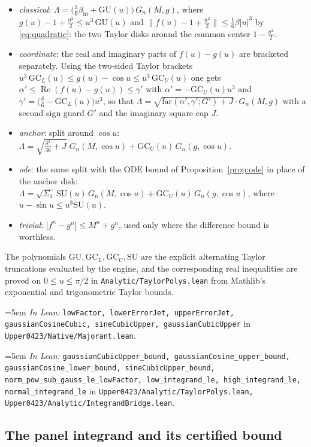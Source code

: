\documentclass[11pt,a4paper]{article}
\theoremstyle{definition}
\newcommand{\Lean}[1]{\texttt{#1}}
\newcommand{\file}[1]{\texttt{#1}}
\newcommand{\formal}[2]{%
  \par\smallskip
  \begingroup\small\raggedright\emergencystretch=5em
  \noindent\textit{In Lean:} \Lean{#1} in \file{#2}.\par
  \endgroup\smallskip}
\begin{document}
\begin{itemize}[leftmargin=1.6em]
\item \emph{classical}: $\Lambda=\bigl(\tfrac16\beta_{\mathrm{hi}}
  + \mathrm{GU}(u)\bigr)\,G_n(M,g)$, where
  $g(u)-1+\tfrac{u^2}2\le u^3\,\mathrm{GU}(u)$ and
  $\|f(u)-1+\tfrac{u^2}2\|\le\tfrac16\beta|u|^3$ by \eqref{eq:quadratic}: the two
  Taylor disks around the common center $1-\tfrac{u^2}2$.
\item \emph{coordinate}: the real and imaginary parts of $f(u)-g(u)$ are
  bracketed separately. Using the two-sided Taylor brackets
  $u^3\,\mathrm{GC}_L(u)\le g(u)-\cos u\le u^3\,\mathrm{GC}_U(u)$ one gets
  $\alpha'\le\operatorname{Re}(f(u)-g(u))\le\gamma'$ with
  $\alpha'=-\mathrm{GC}_U(u)u^3$ and
  $\gamma'=\bigl(\tfrac{\delta}{6}-\mathrm{GC}_L(u)\bigr)u^3$, so that
  $\Lambda=\sqrt{\mathrm{far}(\alpha',\gamma';G')+J}\cdot G_n(M,g)$ with a second
  sign guard $G'$ and the imaginary square cap $J$.
\item \emph{anchor}: split around $\cos u$:
  $\Lambda=\sqrt{\tfrac{\delta^2}{36}+J}\;G_n(M,\cos u)
  + \mathrm{GC}_U(u)\,G_n(g,\cos u)$.
\item \emph{ode}: the same split with the ODE bound of
  Proposition~\ref{prop:ode} in place of the anchor disk:
  $\Lambda=\sqrt{\Sigma_1}\,\mathrm{SU}(u)\,G_n(M,\cos u)
  + \mathrm{GC}_U(u)\,G_n(g,\cos u)$, where $u-\sin u\le u^3\mathrm{SU}(u)$.
\item \emph{trivial}: $|f^n-g^n|\le M^n+g^n$, used only where the difference
  bound is worthless.
\end{itemize}
The polynomials $\mathrm{GU},\mathrm{GC}_L,\mathrm{GC}_U,\mathrm{SU}$ are the
explicit alternating Taylor truncations evaluated by the engine, and the
corresponding real inequalities are proved on $0\le u\le\pi/2$ in
\file{Analytic/TaylorPolys.lean} from Mathlib's exponential and trigonometric
Taylor bounds.
\formal{lowFactor, lowerErrorJet, upperErrorJet, gaussianCosineCubic, sineCubicUpper, gaussianCubicUpper}{Upper0423/Native/Majorant.lean}
\formal{gaussianCubicUpper\_bound, gaussianCosine\_upper\_bound, gaussianCosine\_lower\_bound, sineCubicUpper\_bound, norm\_pow\_sub\_gauss\_le\_lowFactor, low\_integrand\_le, high\_integrand\_le, normal\_integrand\_le}{Upper0423/Analytic/TaylorPolys.lean, Upper0423/Analytic/IntegrandBridge.lean}

\subsection{The panel integrand and its certified bound}
\end{document}
